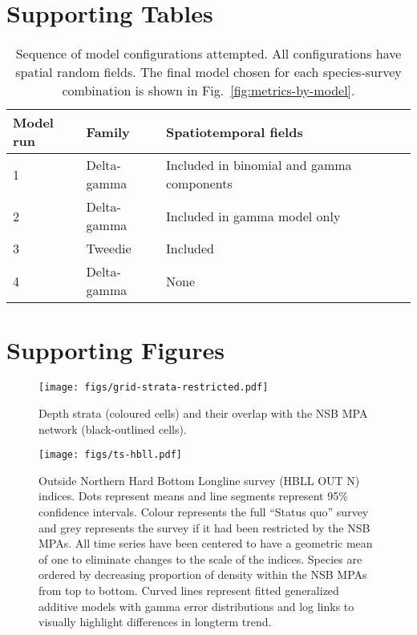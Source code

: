 \documentclass[12pt]{article}
\begin{document}
\clearpage

\section*{Supporting Tables}



\clearpage

\begin{table}[htpb]
\caption{Sequence of model configurations attempted. All configurations have
spatial random fields. The final model chosen for each species-survey combination is shown in Fig.~\ref{fig:metrics-by-model}.}
\centering
\begin{tabular}{lllll}
\toprule
Model run & Family & Spatiotemporal fields  \\
\midrule
1 & Delta-gamma & Included in binomial and gamma components  \\
2 & Delta-gamma & Included in gamma model only \\
3 & Tweedie & Included  \\
4 & Delta-gamma & None \\
\bottomrule
\end{tabular}
\label{tab:model-configs}
\end{table}

\clearpage

\section*{Supporting Figures}

\begin{figure}[htb]
    \centering
    \texttt{[image: figs/grid-strata-restricted.pdf]}
    \caption{Depth strata (coloured cells) and their overlap with the NSB MPA network (black-outlined cells).}
    \label{fig:strata}
\end{figure}

\clearpage

\begin{figure}[htb]
    \centering
    \texttt{[image: figs/ts-hbll.pdf]}
    \caption{Outside Northern Hard Bottom Longline survey (HBLL OUT N) indices. Dots represent means and line segments represent 95\% confidence intervals. Colour represents the full ``Status quo'' survey and grey represents the survey if it had been restricted by the NSB MPAs. All time series have been centered to have a geometric mean of one to eliminate changes to the scale of the indices. Species are ordered by decreasing proportion of density within the NSB MPAs from top to bottom. Curved lines represent fitted generalized additive models with gamma error distributions and log links to visually highlight differences in longterm trend.}
    \label{fig:ts-hbll}
\end{figure}
\end{document}

